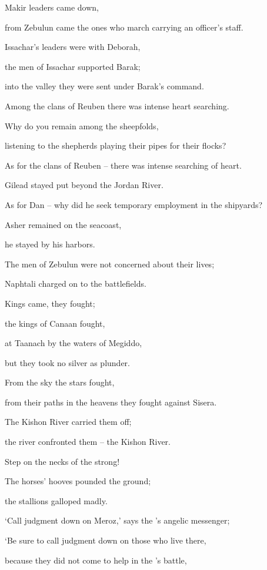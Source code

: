 {Makir
leaders
came down,
\par }{\Q from Zebulun
came the ones who march carrying
an officer’s
staff.
\par }{\Q {}Issachar’s
leaders
were with
Deborah,
\par }{\Q the men of Issachar
supported
Barak;
\par }{\Q into the valley
they were sent
under Barak’s command.
\par }{\Q Among the clans
of Reuben
there was intense
heart
searching.
\par }{\Q {}Why
do you remain
among
the sheepfolds,
\par }{\Q listening
to the shepherds playing their pipes
for their flocks?

\par }{\Q As for the clans
of Reuben
– there was intense
searching
of heart.
\par }{\Q {}Gilead
stayed put
beyond
the Jordan River.
\par }{\Q As for Dan
– why
did he seek temporary employment
in the shipyards?

\par }{\Q Asher
remained
on
the seacoast,
\par }{\Q he stayed
by his harbors.
\par }{\Q {}The men of Zebulun
were not concerned
about their lives;
\par }{\Q Naphtali
charged on
to the battlefields.
\par }{\Q {}Kings
came,
they fought;
\par }{\Q the kings
of Canaan
fought,
\par }{\Q at
Taanach
by the waters
of Megiddo,
\par }{\Q but they took
no
silver as plunder.
\par }{\Q {}From
the sky
the stars
fought,
\par }{\Q from their paths
in the heavens they fought
against
Sisera.
\par }{\Q {}The Kishon
River
carried
them off;
\par }{\Q the river
confronted them – the Kishon River.
\par }{\Q Step on the necks of the strong!
\par }{\Q {}The horses’
hooves
pounded
the ground;

\par }{\Q the stallions
galloped madly.
\par }{\Q {}‘Call judgment down on
Meroz,’
says
the
{}’s
angelic messenger;
\par }{\Q ‘Be sure
to call judgment down on
those who live
there,
\par }{\Q because
they did not
come
to help
in the
{}’s
battle,

}
